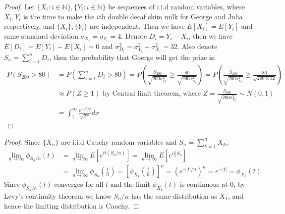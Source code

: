 \documentclass[10pt]{article}
\newenvironment{problem}[2][Problem]{\begin{trivlist}
\item[\hskip \labelsep {\bfseries #1}\hskip \labelsep {\bfseries #2.}]}{\end{trivlist}}
\begin{document}

\begin{problem}{4}
\end{problem}

\begin{proof}
Let $\{X_{i}: i\in \mathbb{N}\}, \{Y_{i}: i\in \mathbb{N}\}$ be sequences of i.i.d random variables, where $X_{i}, Y_{i}$ is the time to make the $i$th double decaf skim milk for George and Julia respectively, and $\{X_{i}\},\{Y_{i}\}$ are independent. 
Then we have $E[X_{i}] = E[Y_{i}]$ and same standard deviation $\sigma_{X_{i}} = \sigma_{Y_{i}} = 4$.
Denote $D_{i} = Y_{i} - X_{i}$, then we have $E[D_{i}] = E[Y_{i}] - E[X_{i}] =0$ and $\sigma^2_{D_{i}} = \sigma^2_{Y_{i}} + \sigma^2_{X_{i}} = 32$.
Also denote $S_{n} = \sum_{i=1}^{n}D_{i}$, then the probability that Goerge will get the prize is:
\begin{equation}
\begin{split}
P(S_{200} > 80) &= P(\sum_{i=1}^{n}D_{i} > 80)
=P(\frac{S_{200}}{\sqrt{200\sigma^2_{D_{i}}}} \ge \frac{80}{\sqrt{200\sigma^2_{D_{i}}}})
= P(\frac{S_{200}}{\sqrt{200\sigma^2_{D_{i}}}} \ge \frac{80}{\sqrt{200\times 32}})\\
&\approx P(Z \ge 1) \text{ by Central limit theorem, where }
Z = \frac{S_{200}}{\sqrt{200\sigma^2_{D_{i}}}} \sim N(0,1)\\
&= \int_{1}^{\infty}\frac{e^{-x^2/2}}{\sqrt{2\pi}}dx
\end{split}
\end{equation}

\end{proof}


\begin{problem}{5}
\end{problem}

\begin{proof}
Since $\{X_{n}\}$ are i.i.d Cauchy random variables and $S_{n} = \sum_{k=1}^{n}X_{k}$,
\begin{equation}
\begin{split}
\lim_{n\rightarrow \infty}\phi_{S_{n}/n}(t) &= \lim_{n\rightarrow \infty}E[e^{it(S_{n}/n)}] = \lim_{n\rightarrow \infty}E[e^{i\frac{t}{n}S_{n}}] \\
&= \lim_{n\rightarrow \infty}\phi_{S_{n}}(\frac{t}{n}) = [\phi_{X_{1}}(\frac{t}{n})]^n
= (e^{-|t|/n})^n = e^{-|t|} = \phi_{X_{1}}(t)
\end{split}
\end{equation}
Since $\phi_{S_{n}/n}(t)$ converges for all $t$ and the limit $\phi_{X_{1}}(t)$ is continuous at 0, by Levy's continuity theorem we know $S_{n}/n$ has the same distribution as $X_{1}$, and hence the limiting distribution is Cauchy.
\end{proof}

\end{document}
